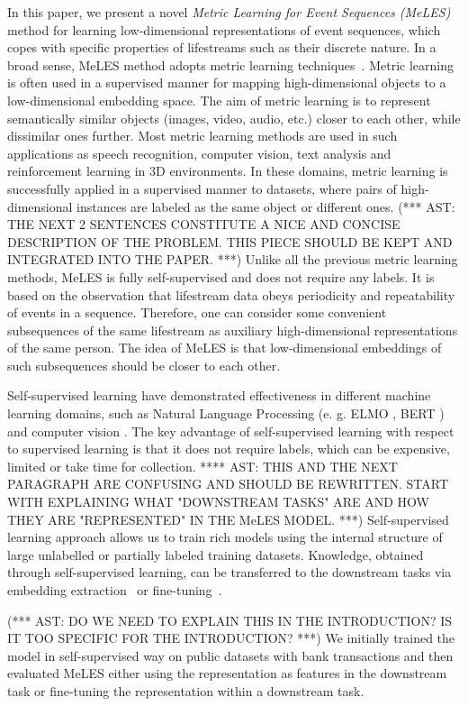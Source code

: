 \documentclass[sigconf, anonymous]{acmart}
\begin{document}
In this paper, we present a novel \emph{Metric Learning for Event Sequences (MeLES)} method for learning low-dimensional representations of event sequences, which copes with specific properties of lifestreams such as their discrete nature. In a broad sense, MeLES method adopts metric learning techniques~\cite{???}. Metric learning is often used in a supervised manner for mapping high-dimensional objects to a low-dimensional embedding space. The aim of metric learning is to represent semantically similar objects (images, video, audio, etc.) closer to each other, while dissimilar ones further. Most metric learning methods are used in such applications as speech recognition, computer vision, text analysis and reinforcement learning in 3D environments. In these domains, metric learning is successfully applied in a supervised manner to datasets, where pairs of high-dimensional instances are labeled as the same object or different ones. 
(*** AST: THE NEXT 2 SENTENCES CONSTITUTE A NICE AND CONCISE DESCRIPTION OF THE PROBLEM. THIS PIECE SHOULD BE KEPT AND INTEGRATED INTO THE PAPER. ***) Unlike all the previous metric learning methods, MeLES is fully self-supervised and does not require any labels. It is based on the observation that lifestream data obeys periodicity and repeatability of events in a sequence. Therefore, one can consider some convenient subsequences of the same lifestream as auxiliary high-dimensional representations of the same person. The idea of MeLES is that low-dimensional embeddings of such subsequences should be closer to each other.


Self-supervised learning have demonstrated effectiveness in different machine learning domains, such as Natural Language Processing (e. g. ELMO \cite{ELMO2018}, BERT \cite{Devlin2019BERTPO}) and computer vision \cite{doersch2015unsupervised}. The key advantage of self-supervised learning with respect to supervised learning is that it does not require labels, which can be expensive, limited or take time for collection. 
**** AST: THIS AND THE NEXT PARAGRAPH ARE CONFUSING AND SHOULD BE REWRITTEN. START WITH EXPLAINING WHAT "DOWNSTREAM TASKS" ARE AND HOW THEY ARE "REPRESENTED" IN THE MeLES MODEL. ***)
Self-supervised learning approach allows us to train rich models using the internal structure of large unlabelled or partially labeled training datasets. Knowledge, obtained through self-supervised learning, can be transferred to the downstream tasks via embedding extraction~\cite{word2vec} or fine-tuning~\cite{Devlin2019BERTPO}.

(*** AST: DO WE NEED TO EXPLAIN THIS IN THE INTRODUCTION? IS IT TOO SPECIFIC FOR THE INTRODUCTION? ***)
We initially trained the model in self-supervised way on public datasets with bank transactions and then evaluated MeLES either using the representation as features in the downstream task or fine-tuning the representation within a downstream task.
\end{document}
